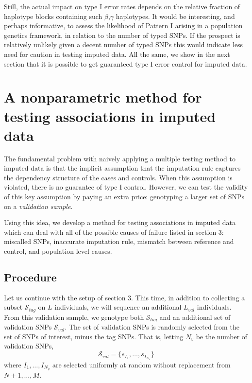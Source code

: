 \documentclass[12pt]{article}
\begin{document}
Still, the actual impact on type I error rates depends on
the relative fraction of haplotype blocks containing such
$\beta$,$\gamma$ haplotypes.
It would be interesting, and perhaps informative, to assess the
likelihood of Pattern I arising in a population genetics
framework, in relation to the number of typed SNPs.
If the prospect is relatively unlikely given a decent number of typed SNPs this would indicate less need for
caution in testing imputed data.
All the same, we show in the next section that it is possible
to get guaranteed type I error control for imputed data.

\section{A nonparametric method for testing associations in imputed data}

The fundamental problem with naively applying a multiple testing
method
to imputed data is that the implicit assumption that the imputation
rule captures the dependency structure of the cases and controls.
When this assumption is violated, there is no guarantee of type I
control.
However, we can test the validity of this key assumption
by paying an extra price:
genotyping a larger set of SNPs on a \emph{validation sample}.

Using this idea, we develop a method for testing associations in imputed
data which can deal with all of the possible causes of failure
listed in section 3: miscalled SNPs, inaccurate imputation rule,
mismatch between reference and control, and population-level causes.

\subsection{Procedure}

Let us continue with the setup of section 3.
This time, in addition to collecting a subset $\mathcal{S}_{tag}$
on $L$ individuals,
we will sequence an additional $L_{val}$ individuals.
From this validation sample, we genotype both $\mathcal{S}_{tag}$ and 
an additional set of validation SNPs $\mathcal{S}_{val}$.
The set of validation SNPs is randomly selected from the set of SNPs
of interest, minus the tag SNPs.
That is, letting $N_v$ be the number of validation SNPs,
\[
\mathcal{S}_{val}= \{s_{I_1},\hdots,s_{I_{N_v}}\}
\]
where $I_1,\hdots,I_{N_v}$ are selected uniformly at random
without replacement from $N+1,\hdots,M$.
\end{document}
